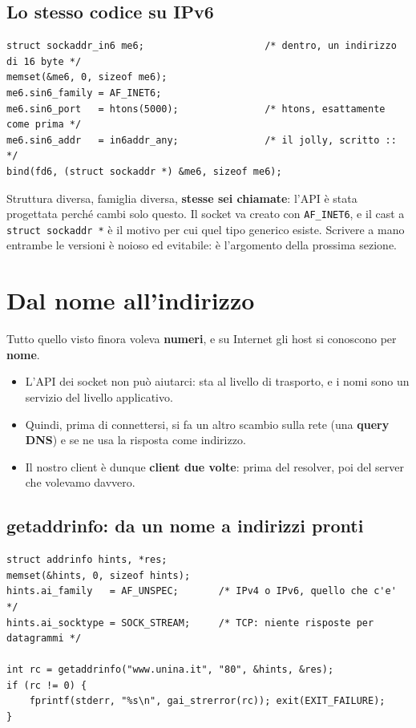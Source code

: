 \subsection{Lo stesso codice su IPv6}

\begin{lstlisting}[language={[POSIX]C}]
struct sockaddr_in6 me6;                     /* dentro, un indirizzo di 16 byte */
memset(&me6, 0, sizeof me6);
me6.sin6_family = AF_INET6;
me6.sin6_port   = htons(5000);               /* htons, esattamente come prima */
me6.sin6_addr   = in6addr_any;               /* il jolly, scritto :: */
bind(fd6, (struct sockaddr *) &me6, sizeof me6);
\end{lstlisting}

Struttura diversa, famiglia diversa, \textbf{stesse sei chiamate}: l'API è stata progettata perché cambi solo questo. Il
socket va creato con \texttt{AF\_INET6}, e il cast a \texttt{struct sockaddr *} è il motivo per cui quel tipo generico
esiste. Scrivere a mano entrambe le versioni è noioso ed evitabile: è l'argomento della prossima sezione.

\section{Dal nome all'indirizzo}

Tutto quello visto finora voleva \textbf{numeri}, e su Internet gli host si conoscono per \textbf{nome}.
\begin{itemize}
    \item L'API dei socket non può aiutarci: sta al livello di trasporto, e i nomi sono un servizio del livello applicativo.
    \item Quindi, prima di connettersi, si fa un altro scambio sulla rete (una \textbf{query DNS}) e se ne usa la risposta
          come indirizzo.
    \item Il nostro client è dunque \textbf{client due volte}: prima del resolver, poi del server che volevamo davvero.
\end{itemize}

\subsection{getaddrinfo: da un nome a indirizzi pronti}

\begin{lstlisting}[language={[POSIX]C}, style=wnumbers, title={Risolvere nome e servizio insieme}]
struct addrinfo hints, *res;
memset(&hints, 0, sizeof hints);
hints.ai_family   = AF_UNSPEC;       /* IPv4 o IPv6, quello che c'e' */
hints.ai_socktype = SOCK_STREAM;     /* TCP: niente risposte per datagrammi */

int rc = getaddrinfo("www.unina.it", "80", &hints, &res);
if (rc != 0) {
    fprintf(stderr, "%s\n", gai_strerror(rc)); exit(EXIT_FAILURE);
}
\end{lstlisting}

